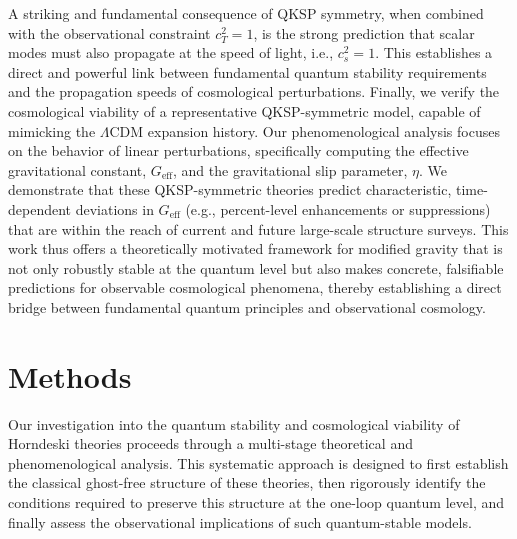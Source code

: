 \documentclass[twocolumn]{aastex631}
\begin{document}
A striking and fundamental consequence of QKSP symmetry, when combined with the observational constraint $c_T^2=1$, is the strong prediction that scalar modes must also propagate at the speed of light, i.e., $c_s^2=1$. This establishes a direct and powerful link between fundamental quantum stability requirements and the propagation speeds of cosmological perturbations. Finally, we verify the cosmological viability of a representative QKSP-symmetric model, capable of mimicking the $\Lambda$CDM expansion history. Our phenomenological analysis focuses on the behavior of linear perturbations, specifically computing the effective gravitational constant, $G_{\text{eff}}$, and the gravitational slip parameter, $\eta$. We demonstrate that these QKSP-symmetric theories predict characteristic, time-dependent deviations in $G_{\text{eff}}$ (e.g., percent-level enhancements or suppressions) that are within the reach of current and future large-scale structure surveys. This work thus offers a theoretically motivated framework for modified gravity that is not only robustly stable at the quantum level but also makes concrete, falsifiable predictions for observable cosmological phenomena, thereby establishing a direct bridge between fundamental quantum principles and observational cosmology.


\section{Methods}
\label{sec:methods}
Our investigation into the quantum stability and cosmological viability of Horndeski theories proceeds through a multi-stage theoretical and phenomenological analysis. This systematic approach is designed to first establish the classical ghost-free structure of these theories, then rigorously identify the conditions required to preserve this structure at the one-loop quantum level, and finally assess the observational implications of such quantum-stable models.
\end{document}
